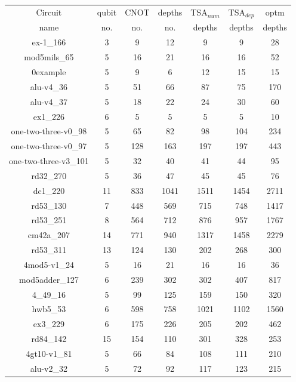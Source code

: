 \documentclass[runningheads]{llncs}
\begin{document}
						\begin{table}[H]
							\begin{center}  
							\begin{tabular}{|c|c|c|c|c|c|c|}
							\hline
							Circuit &  qubit  & CNOT &depths &TSA$_{num}$& TSA$_{dep}$  & optm 	  	\\
							 name	&   no. 	&	no. & no. & depths&  depths &  depths 	\\
							\hline
							ex-1\_166 & 3 & 9 & 12 & 9 & 9 & 28 \\
							mod5mils\_65 & 5 & 16 & 21 & 16 & 16 & 52 \\
							0example & 5 & 9 & 6 & 12 & 15 & 15 \\
							alu-v4\_36 & 5 & 51 & 66 & 87 & 75 & 170 \\
							alu-v4\_37 & 5 & 18 & 22 & 24 & 30 & 60 \\
							ex1\_226 & 6 & 5 & 5 & 5 & 5 & 10 \\
							one-two-three-v0\_98 & 5 & 65 & 82 & 98 & 104 & 234 \\
							one-two-three-v0\_97 & 5 & 128 & 163 & 197 & 197 & 443 \\
							one-two-three-v3\_101 & 5 & 32 & 40 & 41 & 44 & 95 \\
							rd32\_270 & 5 & 36 & 47 & 45 & 45 & 76 \\
							dc1\_220 & 11 & 833 & 1041 & 1511 & 1454 & 2711 \\
							rd53\_130 & 7 & 448 & 569 & 715 & 748 & 1417 \\
							rd53\_251 & 8 & 564 & 712 & 876 & 957 & 1767 \\
							cm42a\_207 & 14 & 771 & 940 & 1317 & 1458 & 2279 \\
							rd53\_311 & 13 & 124 & 130 & 202 & 268 & 300 \\
							4mod5-v1\_24 & 5 & 16 & 21 & 16 & 16 & 36 \\
							mod5adder\_127 & 6 & 239 & 302 & 302 & 407 & 817 \\
							4\_49\_16 & 5 & 99 & 125 & 159 & 150 & 320 \\
							hwb5\_53 & 6 & 598 & 758 & 1021 & 1102 & 1560 \\
							ex3\_229 & 6 & 175 & 226 & 205 & 202 & 462 \\
							rd84\_142 & 15 & 154 & 110 & 301 & 328 & 253 \\
							4gt10-v1\_81 & 5 & 66 & 84 & 108 & 111 & 210 \\
							alu-v2\_32 & 5 & 72 & 92 & 117 & 123 & 215 \\

\end{tabular}
\end{center}
\end{table}
\end{document}

